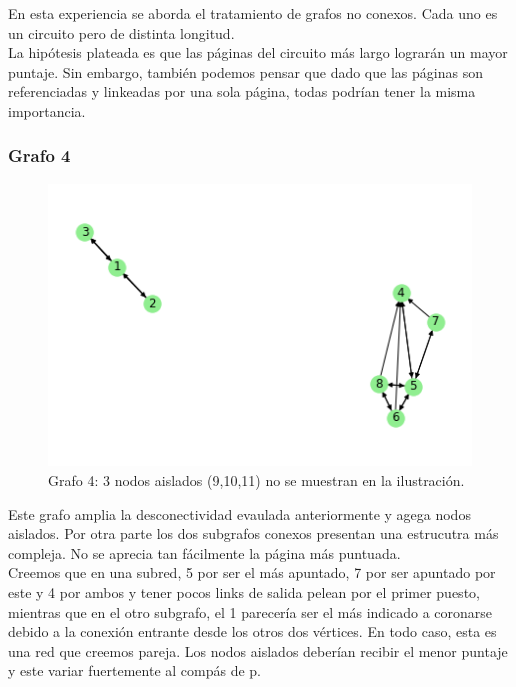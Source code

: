 En esta experiencia se aborda el tratamiento de grafos no conexos. Cada uno es un circuito pero de distinta longitud. \\

La hipótesis plateada es que las páginas del circuito más largo lograrán un mayor puntaje. Sin embargo, también podemos pensar que dado que las páginas son referenciadas y linkeadas por una sola página, todas podrían tener la misma importancia. \\

\subsubsection{Grafo 4}

\begin{figure}[H]
   \begin{center}
     \includegraphics{img/prueba_aislado.png} 
  \end{center}
\caption{Grafo 4: 3 nodos aislados (9,10,11) no se muestran en la ilustración.} \label{fig:exp3-aislado}
\end{figure}

Este grafo amplia la desconectividad evaulada anteriormente y agega nodos aislados. Por otra parte los dos subgrafos conexos presentan una estrucutra más compleja. No se aprecia tan fácilmente la página más puntuada.\\

Creemos que en una subred, 5 por ser el más apuntado, 7 por ser apuntado por este y 4 por ambos y tener pocos links de salida pelean por el primer puesto, mientras que en el otro subgrafo, el 1 parecería ser el más indicado a coronarse debido a la conexión entrante desde los otros dos vértices. En todo caso, esta es una red que creemos pareja.
Los nodos aislados deberían recibir el menor puntaje y este variar fuertemente al compás de p. \\

